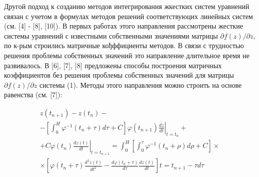 \documentclass[10pt]{article}
\begin{document}
Другой подход к созданию методов интегрирования жкестких систем уравнений связан с учетом в формулах методов решений соответствуюцих линейных систем (см. [4] - [8], [10]). В первых работах этого направления рассмотрены жесткие системы уравнений с известными собственными значениями матрицы $\partial f(z) / \partial z$, по к-рым строились матричные кођффициенты методов. В связи с трудностью решения проблемы собственных значений это направление длительное время не развивалось. В [6], [7], [8] предложены способы построения матричных коэффициентов без решения проблемы собственных значений для матрицы $\partial f(z) / \partial z$ системы (1). Методы этого направления можно строить на основе равенства (см. [7]):



\[

\begin{gathered}

z\left(t_{n+1}\right)-z\left(t_{n}\right)- \\

-\left.\left[\int_{0}^{H} \varphi^{-1}\left(t_{n}+\tau\right) d \tau+C\right] \varphi\left(t_{n+1}\right) \frac{d z}{d t}\right|_{t=t_{n}}+ \\

+\left.C \varphi\left(t_{n}\right) \frac{d z(t)}{d t}\right|_{t=t_{n+1}}=\int_{0}^{H}\left[\int_{0}^{\tau} \varphi^{-1}\left(t_{n}+\rho\right) d \rho+C\right] \times \\

\times\left[\varphi\left(t_{n}+\tau\right) \frac{d^{2} z(t)}{d t^{2}}-\frac{d \varphi\left(t_{n}+\tau\right)}{d \tau} \frac{d z(t)}{d t}\right] t=t_{n+1}-\tau d \tau

\end{gathered}

\]
\end{document}
